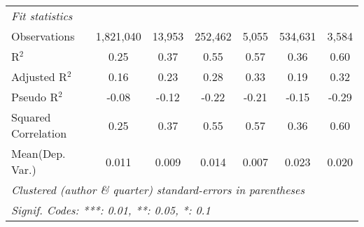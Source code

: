 \begin{tabular}{lcccccc}
   \midrule
   \emph{Fit statistics}\\
   Observations                                               & 1,821,040     & 13,953       & 252,462  & 5,055          & 534,631       & 3,584\\  
   R$^2$                                                      & 0.25          & 0.37         & 0.55     & 0.57           & 0.36          & 0.60\\  
   Adjusted R$^2$                                             & 0.16          & 0.23         & 0.28     & 0.33           & 0.19          & 0.32\\  
   Pseudo R$^2$                                               & -0.08         & -0.12        & -0.22    & -0.21          & -0.15         & -0.29\\  
   Squared Correlation                                        & 0.25          & 0.37         & 0.55     & 0.57           & 0.36          & 0.60\\  
Mean(Dep. Var.) & 0.011 & 0.009 & 0.014 & 0.007 & 0.023 & 0.020 \\
   \midrule \midrule
   \multicolumn{7}{l}{\emph{Clustered (author \& quarter) standard-errors in parentheses}}\\
   \multicolumn{7}{l}{\emph{Signif. Codes: ***: 0.01, **: 0.05, *: 0.1}}\\
\end{tabular}
\par\endgroup
